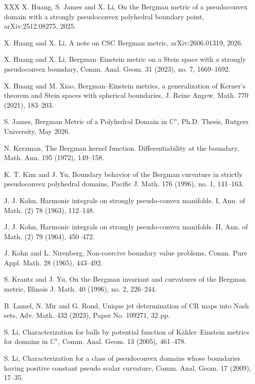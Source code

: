\documentclass[a4paper,centertags,oneside,12pt]{amsart}
\numberwithin{equation}{section}
\begin{document}
\begin{thebibliography}{XXX}
 X. Huang, S. James and X. Li, On the Bergman metric of a pseudoconvex domain with a strongly pseudoconvex polyhedral boundary point, arXiv:2512.08275, 2025.

 X. Huang and X. Li, A note on CSC Bergman metric, arXiv:2606.01319, 2026.

 X. Huang and X. Li, Bergman--Einstein metric on a Stein space with a strongly pseudoconvex boundary, Comm. Anal. Geom. 31 (2023), no. 7, 1669--1692.

 X. Huang and M. Xiao, Bergman--Einstein metrics, a generalization of Kerner's theorem and Stein spaces with spherical boundaries, J. Reine Angew. Math. 770 (2021), 183--203.

 S. James, Bergman Metric of a Polyhedral Domain in $\mathbb{C}^n$, Ph.D. Thesis, Rutgers University, May 2026.

 N. Kerzman, The Bergman kernel function. Differentiability at the boundary, Math. Ann. 195 (1972), 149--158.

 K. T. Kim and J. Yu, Boundary behavior of the Bergman curvature in strictly pseudoconvex polyhedral domains, Pacific J. Math. 176 (1996), no. 1, 141--163.

 J. J. Kohn, Harmonic integrals on strongly pseudo-convex manifolds. I, Ann. of Math. (2) 78 (1963), 112--148.

 J. J. Kohn, Harmonic integrals on strongly pseudo-convex manifolds. II, Ann. of Math. (2) 79 (1964), 450--472.

 J. Kohn and L. Nirenberg, Non-coercive boundary value problems, Comm. Pure Appl. Math. 28 (1965), 443--492.

 S. Krantz and J. Yu, On the Bergman invariant and curvatures of the Bergman metric, Illinois J. Math. 40 (1996), no. 2, 226--244.

 B. Lamel, N. Mir and G. Rond, Unique jet determination of CR maps into Nash sets, Adv. Math. 432 (2023), Paper No. 109271, 32 pp.

 S. Li, Characterization for balls by potential function of K\"ahler--Einstein metrics for domains in $\mathbb{C}^n$, Comm. Anal. Geom. 13 (2005), 461--478.

 S. Li, Characterization for a class of pseudoconvex domains whose boundaries having positive constant pseudo scalar curvature, Comm. Anal. Geom. 17 (2009), 17--35.


\end{thebibliography}
\end{document}
